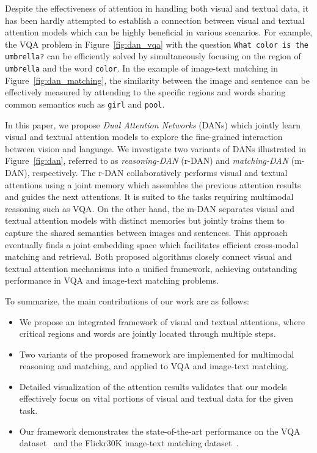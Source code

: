 \documentclass[10pt,twocolumn,letterpaper]{article}
\begin{document}
Despite the effectiveness of attention in handling both visual and textual data, it has been hardly attempted to establish a connection between visual and textual attention models which can be highly beneficial in various scenarios.
For example, the VQA problem in Figure~\ref{fig:dan_vqa} with the question {\tt What color is the umbrella?} can be efficiently solved by simultaneously focusing on the region of {\tt umbrella} and the word {\tt color}.
In the example of image-text matching in Figure~\ref{fig:dan_matching}, the similarity between the image and sentence can be effectively measured by attending to the specific regions and words sharing common semantics such as {\tt girl} and {\tt pool}.

In this paper, we propose \textit{Dual Attention Networks} (DANs) which jointly learn visual and textual attention models to explore the fine-grained interaction between vision and language.
We investigate two variants of DANs illustrated in Figure~\ref{fig:dan}, referred to as \textit{reasoning-DAN} (r-DAN) and \textit{matching-DAN} (m-DAN), respectively.
The r-DAN collaboratively performs visual and textual attentions using a joint memory which assembles the previous attention results and guides the next attentions.
It is suited to the tasks requiring multimodal reasoning such as VQA.
On the other hand, the m-DAN separates visual and textual attention models with distinct memories but jointly trains them to capture the shared semantics between images and sentences.
This approach eventually finds a joint embedding space which facilitates efficient cross-modal matching and retrieval.
Both proposed algorithms closely connect visual and textual attention mechanisms into a unified framework, achieving outstanding performance in VQA and image-text matching problems.

To summarize, the main contributions of our work are as follows:
\begin{itemize}
\item We propose an integrated framework of visual and textual attentions, where critical regions and words are jointly located through multiple steps.
\item Two variants of the proposed framework are implemented for multimodal reasoning and matching, and applied to VQA and image-text matching.
\item Detailed visualization of the attention results validates that our models effectively focus on vital portions of visual and textual data for the given task.
\item Our framework demonstrates the state-of-the-art performance on the VQA dataset~\cite{antol2015vqa} and the Flickr30K image-text matching dataset~\cite{young2014image}.  
\end{itemize}
\end{document}
